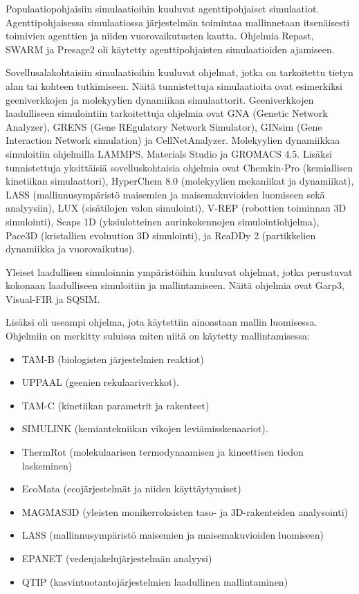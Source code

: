 \documentclass[utf8]{gradu3}
\begin{document}
Populaatiopohjaisiin simulaatioihin kuuluvat agenttipohjaiset simulaatiot.
Agenttipohjaisessa simulaatiossa järjestelmän toimintaa mallinnetaan itsenäisesti toimivien
agenttien ja niiden vuorovaikutusten kautta.
Ohjelmia Repast, SWARM ja Presage2 oli käytetty agenttipohjaisten simulaatioiden ajamiseen.

Sovellusalakohtaisiin simulaatioihin kuuluvat ohjelmat, jotka on tarkoitettu
tietyn alan tai kohteen tutkimiseen.
Näitä tunnistettuja simulaatioita ovat esimerkiksi geeniverkkojen ja molekyylien dynamiikan
simulaattorit.
Geeniverkkojen laadulliseen simulointiin tarkoitettuja ohjelmia ovat
GNA (Genetic Network Analyzer), 
GRENS (Gene REgulatory Network Simulator),
GINsim (Gene Interaction Network simulation) ja CellNetAnalyzer.
Molekyylien dynamiikkaa simuloitiin ohjelmilla 
LAMMPS, Materials Studio ja GROMACS 4.5.
Lisäksi tunnistettuja yksittäisiä sovelluskohtaisia ohjelmia ovat 
Chemkin-Pro (kemiallisen kinetiikan simulaattori),
HyperChem 8.0 (molekyylien mekaniikat ja dynamiikat),
LASS (mallinnusympäristö maisemien ja maisemakuvioiden luomiseen sekä analyysiin),
LUX (sisätilojen valon simulointi),
V-REP (robottien toiminnan 3D simulointi),
Scaps 1D (yksiulotteinen aurinkokennojen simulointiohjelma),
Pace3D (kristallien evoluution 3D simulointi),
ja ReaDDy 2 (partikkelien dynamiikka ja vuorovaikutus).

Yleiset laadullisen simuloinnin ympäristöihin kuuluvat ohjelmat, 
jotka perustuvat kokonaan laadulliseen simuloitiin ja mallintamiseen.
Näitä ohjelmia ovat Garp3, Visual-FIR ja SQSIM.

Lisäksi oli useampi ohjelma, jota käytettiin ainoastaan mallin luomisessa.
Ohjelmiin on merkitty suluissa miten niitä on käytetty mallintamisessa:
\begin{itemize}
    \item TAM-B (biologisten järjestelmien reaktiot)
    \item UPPAAL (geenien rekulaariverkkot).
    \item TAM-C (kinetiikan parametrit ja rakenteet)
    \item SIMULINK (kemiantekniikan vikojen leviämisskenaariot).
    \item ThermRot (molekulaarisen termodynaamisen ja kineettisen tiedon laskeminen)
    \item EcoMata (ecojärjestelmät ja niiden käyttäytymiset)
    \item MAGMAS3D (yleisten monikerroksisten taso- ja 3D-rakenteiden analysointi)
    \item LASS (mallinnusympäristö maisemien ja maisemakuvioiden luomiseen)
    \item EPANET (vedenjakelujärjestelmän analyysi)
    \item QTIP (kasvintuotantojärjestelmien laadullinen mallintaminen)
\end{itemize}
\end{document}
